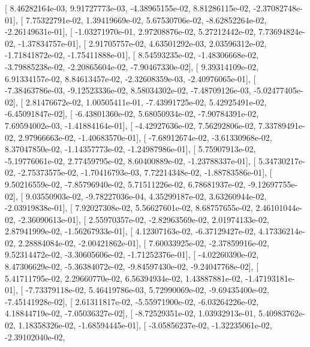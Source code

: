 \documentclass{article}
\begin{document}
       [  8.46282164e-03,   9.91727773e-03,  -4.38965155e-02,
          8.81286115e-02,  -2.37082748e-01],
       [  7.75322791e-02,   1.39419669e-02,   5.67530706e-02,
         -8.62852264e-02,  -2.26149631e-01],
       [ -1.03271970e-01,   2.97208876e-02,   5.27212442e-02,
          7.73694824e-02,  -1.37834757e-01],
       [  2.91705757e-02,   4.63501292e-03,   2.03596312e-02,
         -1.71841872e-02,  -1.75411888e-01],
       [  8.54593235e-02,  -1.48306668e-02,  -3.79885238e-02,
         -2.20865604e-02,  -7.90467330e-02],
       [  9.39314109e-02,   6.91334157e-02,   8.84613457e-02,
         -2.32608359e-03,  -2.40976065e-01],
       [ -7.38463786e-03,  -9.12523336e-02,   8.58034302e-02,
         -7.48709126e-03,  -5.02477405e-02],
       [  2.81476672e-02,   1.00505411e-01,  -7.43991725e-02,
          5.42925491e-02,  -6.45091847e-02],
       [ -6.43801360e-02,   5.68050934e-02,  -7.90784391e-02,
          7.69594002e-03,  -1.41884164e-01],
       [ -4.42927636e-02,   7.56292806e-02,   7.33789491e-02,
          2.97966663e-02,  -1.40683570e-01],
       [ -7.68912674e-02,  -3.61330968e-02,   8.37047850e-02,
         -1.14357773e-02,  -1.24987986e-01],
       [  5.75907913e-02,  -5.19776061e-02,   2.77459795e-02,
          8.60400889e-02,  -1.23788337e-01],
       [  5.34730217e-02,  -2.75373575e-02,  -1.70416793e-03,
          7.72214348e-02,  -1.88783586e-01],
       [  9.50216559e-02,  -7.85796940e-02,   5.71511226e-02,
          6.78681937e-02,  -9.12697755e-02],
       [  9.03550903e-02,  -9.78227036e-04,   4.35299187e-02,
          3.63260944e-02,  -2.03919838e-01],
       [  7.92027308e-02,   5.56627601e-02,   8.68757655e-02,
          2.46101044e-02,  -2.36090613e-01],
       [  2.55970357e-02,  -2.82963569e-02,   2.01974133e-02,
          2.87941999e-02,  -1.56267933e-01],
       [  4.12307163e-02,  -6.37129427e-02,   4.17336214e-02,
          2.28884084e-02,  -2.00421862e-01],
       [  7.60033925e-02,  -2.37859916e-02,   9.52314472e-02,
         -3.30605606e-02,  -1.71252376e-01],
       [ -4.02260390e-02,   8.47306629e-02,  -5.36384072e-02,
         -9.84597430e-02,  -9.24047768e-02],
       [  5.41711795e-02,   2.29660770e-02,   6.56394934e-02,
          1.43887881e-02,  -1.47193181e-01],
       [ -7.73379118e-02,   5.46419786e-03,   5.72990069e-02,
         -9.69435400e-02,  -7.45141928e-02],
       [  2.61311817e-02,  -5.55971900e-02,  -6.03264226e-02,
          4.18844719e-02,  -7.05036327e-02],
       [ -8.72529351e-02,   1.03932913e-01,   5.40983762e-02,
          1.18358326e-02,  -1.68594445e-01],
       [ -3.05856237e-02,  -1.32235061e-02,  -2.39102040e-02,
\end{document}
